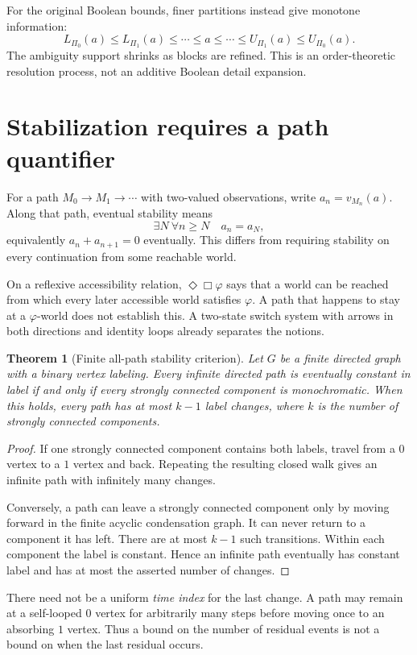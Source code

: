 \documentclass[11pt,letterpaper]{article}
\newtheorem{theorem}{Theorem}[section]
\theoremstyle{definition}
\begin{document}
For the original Boolean bounds, finer partitions instead give monotone information:
\[
L_{\Pi_0}(a)\leq L_{\Pi_1}(a)\leq\cdots\leq a
\leq\cdots\leq U_{\Pi_1}(a)\leq U_{\Pi_0}(a).
\]
The ambiguity support shrinks as blocks are refined. This is an order-theoretic resolution process, not an additive Boolean detail expansion.

\section{Stabilization requires a path quantifier}\label{sec:stability}
For a path $M_0\to M_1\to\cdots$ with two-valued observations, write $a_n=v_{M_n}(a)$. Along that path, eventual stability means
\[
\exists N\ \forall n\geq N\quad a_n=a_N,
\]
equivalently $a_n+a_{n+1}=0$ eventually. This differs from requiring stability on every continuation from some reachable world.

On a reflexive accessibility relation, $\Diamond\Box\varphi$ says that a world can be reached from which every later accessible world satisfies $\varphi$. A path that happens to stay at a $\varphi$-world does not establish this. A two-state switch system with arrows in both directions and identity loops already separates the notions.

\begin{theorem}[Finite all-path stability criterion]\label{thm:stability}
Let $G$ be a finite directed graph with a binary vertex labeling. Every infinite directed path is eventually constant in label if and only if every strongly connected component is monochromatic. When this holds, every path has at most $k-1$ label changes, where $k$ is the number of strongly connected components.
\end{theorem}
\begin{proof}
If one strongly connected component contains both labels, travel from a $0$ vertex to a $1$ vertex and back. Repeating the resulting closed walk gives an infinite path with infinitely many changes.

Conversely, a path can leave a strongly connected component only by moving forward in the finite acyclic condensation graph. It can never return to a component it has left. There are at most $k-1$ such transitions. Within each component the label is constant. Hence an infinite path eventually has constant label and has at most the asserted number of changes.
\end{proof}

There need not be a uniform \emph{time index} for the last change. A path may remain at a self-looped $0$ vertex for arbitrarily many steps before moving once to an absorbing $1$ vertex. Thus a bound on the number of residual events is not a bound on when the last residual occurs.
\end{document}
